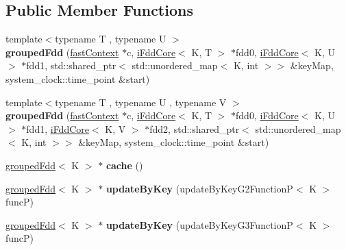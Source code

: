 \subsection*{Public Member Functions}
\begin{DoxyCompactItemize}
\item 
\hypertarget{classfaster_1_1groupedFdd_a56b4d26d000067c2fae35f6f7e323c20}{}{\footnotesize template$<$typename T , typename U $>$ }\\{\bfseries grouped\+Fdd} (\hyperlink{classfaster_1_1fastContext}{fast\+Context} $\ast$c, \hyperlink{classfaster_1_1iFddCore}{i\+Fdd\+Core}$<$ K, T $>$ $\ast$fdd0, \hyperlink{classfaster_1_1iFddCore}{i\+Fdd\+Core}$<$ K, U $>$ $\ast$fdd1, std\+::shared\+\_\+ptr$<$ std\+::unordered\+\_\+map$<$ K, int $>$$>$ \&key\+Map, system\+\_\+clock\+::time\+\_\+point \&start)\label{classfaster_1_1groupedFdd_a56b4d26d000067c2fae35f6f7e323c20}

\item 
\hypertarget{classfaster_1_1groupedFdd_add17ed67376a2c7166b1742d3353e22c}{}{\footnotesize template$<$typename T , typename U , typename V $>$ }\\{\bfseries grouped\+Fdd} (\hyperlink{classfaster_1_1fastContext}{fast\+Context} $\ast$c, \hyperlink{classfaster_1_1iFddCore}{i\+Fdd\+Core}$<$ K, T $>$ $\ast$fdd0, \hyperlink{classfaster_1_1iFddCore}{i\+Fdd\+Core}$<$ K, U $>$ $\ast$fdd1, \hyperlink{classfaster_1_1iFddCore}{i\+Fdd\+Core}$<$ K, V $>$ $\ast$fdd2, std\+::shared\+\_\+ptr$<$ std\+::unordered\+\_\+map$<$ K, int $>$$>$ \&key\+Map, system\+\_\+clock\+::time\+\_\+point \&start)\label{classfaster_1_1groupedFdd_add17ed67376a2c7166b1742d3353e22c}

\item 
\hypertarget{classfaster_1_1groupedFdd_af1256330323bf97826eaa01b0bb91bc1}{}\hyperlink{classfaster_1_1groupedFdd}{grouped\+Fdd}$<$ K $>$ $\ast$ {\bfseries cache} ()\label{classfaster_1_1groupedFdd_af1256330323bf97826eaa01b0bb91bc1}

\item 
\hypertarget{classfaster_1_1groupedFdd_a691248cca7dbed1f3b5cd827eb721dc8}{}\hyperlink{classfaster_1_1groupedFdd}{grouped\+Fdd}$<$ K $>$ $\ast$ {\bfseries update\+By\+Key} (update\+By\+Key\+G2\+Function\+P$<$ K $>$ func\+P)\label{classfaster_1_1groupedFdd_a691248cca7dbed1f3b5cd827eb721dc8}

\item 
\hypertarget{classfaster_1_1groupedFdd_af24f53ee2d42e249fbd6c15ea6946abc}{}\hyperlink{classfaster_1_1groupedFdd}{grouped\+Fdd}$<$ K $>$ $\ast$ {\bfseries update\+By\+Key} (update\+By\+Key\+G3\+Function\+P$<$ K $>$ func\+P)\label{classfaster_1_1groupedFdd_af24f53ee2d42e249fbd6c15ea6946abc}


\end{DoxyCompactItemize}
